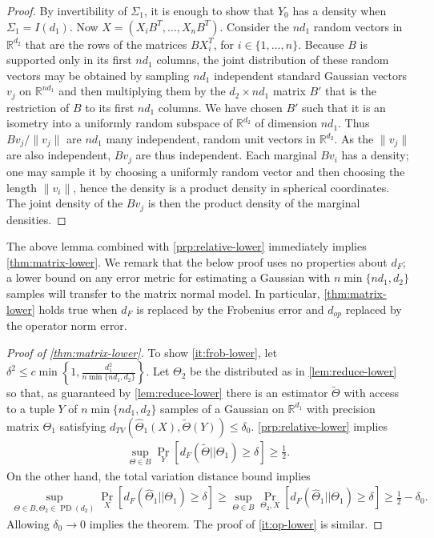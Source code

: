 \documentclass[aos]{imsart}
\theoremstyle{definition}
\numberwithin{equation}{section}
\DeclareMathOperator{\PD}{PD}
\newcommand{\R}{{\mathbb{R}}}
\newcommand{\htheta}{\widehat{\Theta}}
\newcommand{\CF}[1]{{\color{purple}[CF: #1]}}
\begin{document}
\begin{proof}
By invertibility of $\Sigma_1$, it is enough to show that $Y_0$ has a density when $\Sigma_1 = I(d_1)$. Now $X = (X_i B^T, \dots, X_n B^T)$. Consider the $nd_1$ random vectors in $ \R^{d_2}$ that are the rows of the matrices $BX_i^T$, for $i \in \{1, \dots, n\}$. Because $B$ is supported only in its first $nd_1$ columns, the joint distribution of these random vectors may be obtained by sampling $n d_1$ independent standard Gaussian vectors $v_j$ on $\R^{nd_1}$ and then multiplying them by the $d_2 \times nd_1$ matrix $B'$ that is the restriction of $B$ to its first $nd_1$ columns. We have chosen $B'$ such that it is an isometry into a uniformly random subspace of $\R^{d_2}$ of dimension $nd_1$. Thus $Bv_j/\|v_j\|$ are $nd_1$ many independent, random unit vectors in $\R^{d_2}$. As the $\|v_j\|$ are also independent, $B v_j$ are thus independent. Each marginal $Bv_i$ has a density; one may sample it by choosing a uniformly random vector and then choosing the length $\|v_i\|$, hence the density is a product density in spherical coordinates. The joint density of the $Bv_j$ is then the product density of the marginal densities. \end{proof}

The above lemma combined with \cref{prp:relative-lower} immediately implies \cref{thm:matrix-lower}. We remark that the below proof uses no properties about $d_F$; a lower bound on any error metric for estimating a Gaussian with $n \min \{n d_1, d_2\}$ samples will transfer to the matrix normal model. In particular, \cref{thm:matrix-lower} holds true when $d_F$ is replaced by the Frobenius error and $d_{op}$ replaced by the operator norm error.
\begin{proof}[Proof of \cref{thm:matrix-lower}] 

To show \cref{it:frob-lower}, let $\delta^2 \leq c\min \left\{1,\frac{d_1^2}{n \min \{n d_1, d_2\}}\right\}$. Let $\Theta_2$ be the distributed as in \cref{lem:reduce-lower} so that, as guaranteed by \cref{lem:reduce-lower} there is an estimator $\tilde{\Theta}$ with access to a tuple $Y$ of $n \min \{n d_1, d_2\}$ samples of a Gaussian on $\R^{d_1}$ with precision matrix $\Theta_1$ satisfying $d_{TV} (\htheta_1(X), \tilde{\Theta}(Y)) \leq \delta_0$. \cref{prp:relative-lower} implies \begin{align*}
\sup_{\Theta \in B} \Pr_Y\left[ d_F(\tilde{\Theta}|| \Theta_1)  \geq \delta\right] \geq \frac{1}{2}.
\end{align*}
On the other hand, the total variation distance bound implies 
\begin{align*}
\sup_{\Theta \in B, \Theta_2 \in \PD(d_2)} \Pr_{X} \left[ d_F(\htheta_1|| \Theta_1) \geq \delta \right] \geq \sup_{\Theta \in B} \Pr_{\Theta_2, X}\left[ d_F(\htheta_1|| \Theta_1)  \geq \delta\right] \geq \frac{1}{2} - \delta_0.
\end{align*}
Allowing $\delta_0 \to 0$ implies the theorem. The proof of \cref{it:op-lower} is similar.
\end{proof}
\end{document}
